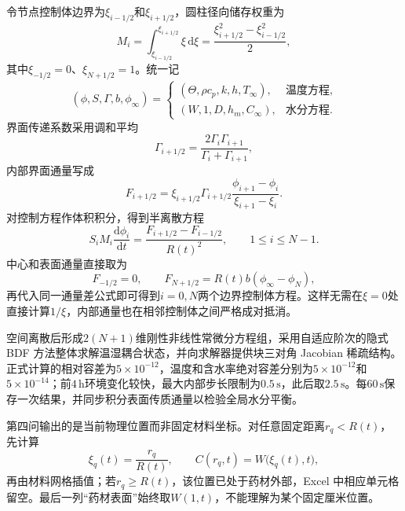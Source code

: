 \documentclass[withoutpreface,bwprint]{cumcmthesis}
\begin{document}
令节点控制体边界为$\xi_{i-1/2}$和$\xi_{i+1/2}$，圆柱径向储存权重为
\begin{equation}
M_i
=\int_{\xi_{i-1/2}}^{\xi_{i+1/2}}\xi\,\mathrm d\xi
=\frac{\xi_{i+1/2}^2-\xi_{i-1/2}^2}{2},
\label{eq:q4-storage-weight}
\end{equation}
其中$\xi_{-1/2}=0$、$\xi_{N+1/2}=1$。统一记
\begin{equation}
(\phi,S,\Gamma,b,\phi_\infty)
=
\begin{cases}
(\Theta,\rho c_p,k,h,T_\infty),&\text{温度方程},\\
(W,1,D,h_m,C_\infty),&\text{水分方程}.
\end{cases}
\label{eq:q4-unified-variables}
\end{equation}
界面传递系数采用调和平均
\begin{equation}
\Gamma_{i+1/2}
=\frac{2\Gamma_i\Gamma_{i+1}}
{\Gamma_i+\Gamma_{i+1}},
\label{eq:q4-harmonic-mean}
\end{equation}
内部界面通量写成
\begin{equation}
F_{i+1/2}
=\xi_{i+1/2}\Gamma_{i+1/2}
\frac{\phi_{i+1}-\phi_i}{\xi_{i+1}-\xi_i}.
\label{eq:q4-face-flux}
\end{equation}
对控制方程作体积积分，得到半离散方程
\begin{equation}
S_iM_i\frac{\mathrm d\phi_i}{\mathrm dt}
=\frac{F_{i+1/2}-F_{i-1/2}}{R(t)^2},
\qquad 1\le i\le N-1.
\label{eq:q4-fvm-interior}
\end{equation}
中心和表面通量直接取为
\begin{equation}
F_{-1/2}=0,
\qquad
F_{N+1/2}
=R(t)b\left(\phi_\infty-\phi_N\right),
\label{eq:q4-boundary-fluxes}
\end{equation}
再代入同一通量差公式即可得到$i=0,N$两个边界控制体方程。这样无需在$\xi=0$处直接计算$1/\xi$，内部通量也在相邻控制体之间严格成对抵消。

空间离散后形成$2(N+1)$维刚性非线性常微分方程组，采用自适应阶次的隐式 BDF 方法整体求解温湿耦合状态，并向求解器提供块三对角 Jacobian 稀疏结构。正式计算的相对容差为$5\times10^{-12}$，温度和含水率绝对容差分别为$5\times10^{-12}$和$5\times10^{-14}$；前$4\,\mathrm h$环境变化较快，最大内部步长限制为$0.5\,\mathrm s$，此后取$2.5\,\mathrm s$。每$60\,\mathrm s$保存一次结果，并同步积分表面传质通量以检验全局水分平衡。

第四问输出的是当前物理位置而非固定材料坐标。对任意固定距离$r_q<R(t)$，先计算
\begin{equation}
\xi_q(t)=\frac{r_q}{R(t)},
\qquad
C(r_q,t)=W\bigl(\xi_q(t),t\bigr),
\label{eq:q4-physical-output}
\end{equation}
再由材料网格插值；若$r_q\ge R(t)$，该位置已处于药材外部，Excel 中相应单元格留空。最后一列“药材表面”始终取$W(1,t)$，不能理解为某个固定厘米位置。
\end{document}
